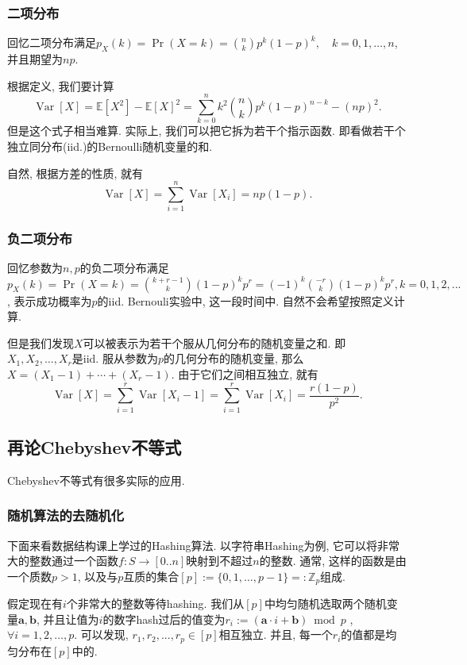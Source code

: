 \documentclass{ctexart}
\begin{document}
\subsubsection{二项分布} 回忆二项分布满足$p_X(k)=\operatorname{Pr}(X=k)=\binom{n}{k} p^k(1-p)^k, \quad k=0,1, \ldots, n$, 并且期望为$np$.

根据定义, 我们要计算$$\operatorname{Var}[X]=\mathbb{E}\left[X^2\right]-\mathbb{E}[X]^2=\sum_{k=0}^n k^2\binom{n}{k} p^k(1-p)^{n-k}-(n p)^2.$$但是这个式子相当难算. 实际上, 我们可以把它拆为若干个指示函数. 即看做若干个独立同分布(iid.)的Bernoulli随机变量的和. 


自然, 根据方差的性质, 就有
$$\operatorname{Var}[X]=\sum_{i=1}^n \operatorname{Var}\left[X_i\right]=n p(1-p).$$

\subsubsection{负二项分布} 回忆参数为$n, p$的负二项分布满足$p_X(k)=\operatorname{Pr}(X=k)=\binom{k+r-1}{k}(1-p)^k p^r=(-1)^k\binom{-r}{k}(1-p)^k p^r, k=0,1,2, ...$, 表示成功概率为$p$的iid. Bernouli实验中, 这一段时间中. 自然不会希望按照定义计算. 

但是我们发现$X$可以被表示为若干个服从几何分布的随机变量之和. 即$X_1, X_2, ..., X_r$是iid. 服从参数为$p$的几何分布的随机变量, 那么$X=\left(X_1-1\right)+\cdots+\left(X_r-1\right)$. 由于它们之间相互独立, 就有
$$\operatorname{Var}[X]=\sum_{i=1}^r \operatorname{Var}\left[X_i-1\right]=\sum_{i=1}^r \operatorname{Var}\left[X_i\right]=\frac{r(1-p)}{p^2}.$$


\subsection{再论Chebyshev不等式} Chebyshev不等式有很多实际的应用. 

\subsubsection{随机算法的去随机化}下面来看数据结构课上学过的Hashing算法. 以字符串Hashing为例, 它可以将非常大的整数通过一个函数$f: S\to [0..n]$映射到不超过$n$的整数. 通常, 这样的函数是由一个质数$p>1$, 以及与$p$互质的集合$[p]:=\{0,1, \ldots, p-1\}=:\mathbb{Z}_p$组成. 

假定现在有$i$个非常大的整数等待hashing. 我们从$[p]$中均匀随机选取两个随机变量$\boldsymbol{a}, \boldsymbol{b}$, 并且让值为$i$的数字hash过后的值变为$r_i:=(\boldsymbol{a} \cdot i+\boldsymbol{b}) \bmod p$ , $\forall i=1,2, \ldots, p$.
可以发现, $r_1, r_2, ..., r_p \in [p]$相互独立. 并且, 每一个$r_i$的值都是均匀分布在$[p]$中的.
\end{document}
